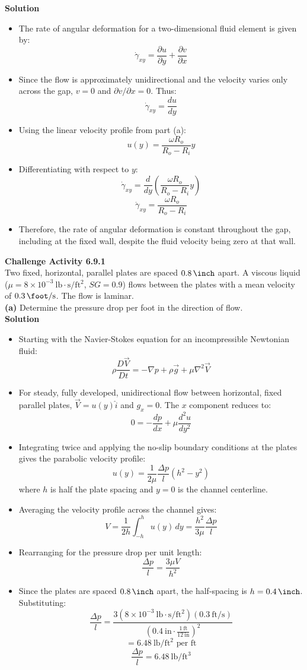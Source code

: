 ﻿\documentclass[12pt]{article}
\begin{document}
\textbf{Solution}
\begin{itemize}
    \item The rate of angular deformation for a two-dimensional fluid element is given by:
    \[\dot{\gamma}_{xy}=\frac{\partial u}{\partial y}+\frac{\partial v}{\partial x}\]
    \item Since the flow is approximately unidirectional and the velocity varies only across the gap, $v=0$ and $\partial v/\partial x=0$. Thus:
    \[\dot{\gamma}_{xy}=\frac{du}{dy}\]
    \item Using the linear velocity profile from part (a):
    \[u(y)=\frac{\omega R_o}{R_o-R_i}y\]
    \item Differentiating with respect to $y$:
    \[\dot{\gamma}_{xy}=\frac{d}{dy}\left(\frac{\omega R_o}{R_o-R_i}y\right)\]
    \[\boxed{\dot{\gamma}_{xy}=\frac{\omega R_o}{R_o-R_i}}\]
    \item Therefore, the rate of angular deformation is constant throughout the gap, including at the fixed wall, despite the fluid velocity being zero at that wall.
\end{itemize}
\textbf{Challenge Activity 6.9.1}\\
Two fixed, horizontal, parallel plates are spaced $\SI{0.8}{\inch}$ apart. A viscous liquid ($\mu=8\times10^{-3}\ \mathrm{lb\cdot s/ft^2}$, $SG=0.9$) flows between the plates with a mean velocity of $\SI{0.3}{\foot\per\second}$. The flow is laminar.\\
\textbf{(a)} Determine the pressure drop per foot in the direction of flow.\\
\textbf{Solution}
\begin{itemize}
    \item Starting with the Navier-Stokes equation for an incompressible Newtonian fluid:
    \[\rho\frac{D\vec{V}}{Dt}=-\nabla p+\rho\vec{g}+\mu\nabla^2\vec{V}\]
    \item For steady, fully developed, unidirectional flow between horizontal, fixed parallel plates, $\vec{V}=u(y)\hat{i}$ and $g_x=0$. The $x$ component reduces to:
    \[0=-\frac{dp}{dx}+\mu\frac{d^2u}{dy^2}\]
    \item Integrating twice and applying the no-slip boundary conditions at the plates gives the parabolic velocity profile:
    \[u(y)=\frac{1}{2\mu}\frac{\Delta p}{l}(h^2-y^2)\]
    where $h$ is half the plate spacing and $y=0$ is the channel centerline.
    \item Averaging the velocity profile across the channel gives:
    \[V=\frac{1}{2h}\int_{-h}^{h}u(y)\,dy=\frac{h^2}{3\mu}\frac{\Delta p}{l}\]
    \item Rearranging for the pressure drop per unit length:
    \[\frac{\Delta p}{l}=\frac{3\mu V}{h^2}\]
    \item Since the plates are spaced $\SI{0.8}{\inch}$ apart, the half-spacing is $h=\SI{0.4}{\inch}$. Substituting:
    \[\frac{\Delta p}{l}=\frac{3\left(8\times10^{-3}\ \mathrm{lb\cdot s/ft^2}\right)\left(0.3\ \mathrm{ft/s}\right)}{\left(0.4\ \mathrm{in}\cdot\frac{1\ \mathrm{ft}}{12\ \mathrm{in}}\right)^2}\]
    \[=6.48\ \mathrm{lb/ft^2}\text{ per ft}\]
    \[\boxed{\frac{\Delta p}{l}=6.48\ \mathrm{lb/ft^3}}\]
\end{itemize}
\end{document}
